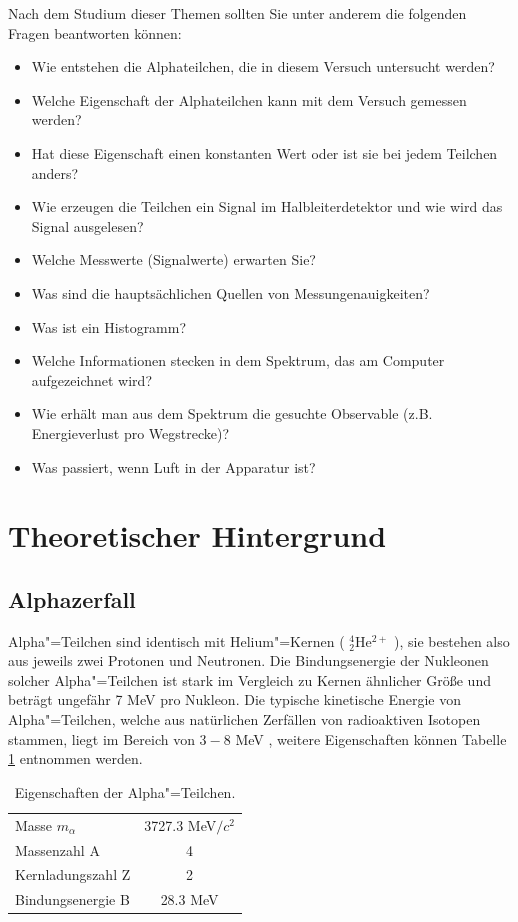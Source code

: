 Nach dem Studium dieser Themen sollten Sie unter anderem die folgenden Fragen beantworten können:
%
\begin{itemize}[itemsep=0pt]
	\item Wie entstehen die Alphateilchen, die in diesem Versuch untersucht werden?
	\item Welche Eigenschaft der Alphateilchen kann mit dem Versuch gemessen werden? 
	\item Hat diese Eigenschaft einen konstanten Wert oder ist sie bei jedem Teilchen anders?
	\item Wie erzeugen die Teilchen ein Signal im Halbleiterdetektor und wie wird das Signal ausgelesen?
	\item Welche Messwerte (Signalwerte) erwarten Sie?
	\item Was sind die hauptsächlichen Quellen von Messungenauigkeiten?
	\item Was ist ein Histogramm?
	\item Welche Informationen stecken in dem Spektrum, das am Computer aufgezeichnet wird?
	\item Wie erhält man aus dem Spektrum die gesuchte Observable (z.B. Energieverlust pro Wegstrecke)?
	\item Was passiert, wenn Luft in der Apparatur ist?
\end{itemize}
\newpage
\section{Theoretischer Hintergrund}
\label{sec:theory}
%
\subsection{Alphazerfall}
Alpha"=Teilchen sind identisch mit Helium"=Kernen ( $^4_2$He$^{2+}$ ), sie bestehen also aus jeweils zwei Protonen und Neutronen. Die Bindungsenergie der Nukleonen solcher Alpha"=Teilchen ist stark im Vergleich zu Kernen ähnlicher Größe und beträgt ungefähr 7 MeV pro Nukleon. Die typische kinetische Energie von Alpha"=Teilchen, welche aus natürlichen Zerfällen von radioaktiven Isotopen stammen, liegt im Bereich von $3-8$ MeV \cite{povh-rith}, weitere Eigenschaften können Tabelle \ref{tab:alpha} entnommen werden.
\begin{table}[h]
	\centering
	\begin{tabular}{lc}
		Masse $m_\alpha$    & 3727.3 MeV$/c^{2}$ \\
		Massenzahl A        & 4    \\
		Kernladungszahl Z   & 2    \\
		Bindungsenergie B   & 28.3 MeV \\
	\end{tabular}
	\caption{Eigenschaften der Alpha"=Teilchen.}\label{tab:alpha}
\end{table}

